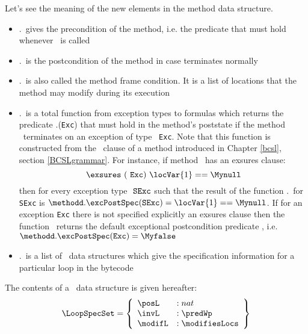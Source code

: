Let's see the meaning of the new elements in the method data structure.
\begin{itemize}
     \item \methodd.\pre \ gives the precondition of the method, i.e. the predicate that must hold
           whenever \methodd \  is called
     \item \methodd.\normalPost \ is the postcondition of the method in case \methodd{} terminates normally  
     
     \item \methodd.\modif \ is also called the method frame condition. It is a list of locations that the method
            may modify during its execution    
     
     \item \methodd.\excPostSpec \ is a total function from exception types to formulas which returns the predicate
           \methodd.\excPostSpec(\texttt{Exc})  that must hold in the method's poststate 
	   if the method \methodd \ terminates on an exception of type \mbox{ \rm \texttt{Exc}}. 
	   Note that this function is constructed from the \exsures \ clause of a method introduced in  Chapter \ref{bcsl},
	   section \ref{BCSLgrammar}. For instance, if method \methodd \ has an exsures clause:
	   $$ \exsures \  ( \mbox{ \rm \texttt{Exc}}) \ \locVar{1} == \Mynull $$
	   then for every exception type $\mbox{ \rm \texttt{SExc}} $ such that 
	    the result of the function \methodd.\excPostSpec \  for  \texttt{SExc} 
           is $\methodd.\excPostSpec(\texttt{SExc} ) = \locVar{1} == \Mynull$. If for an exception \texttt{Exc} there is not specified
	   explicitly an exsures clause then the function \excPostSpec \ returns the default exceptional postcondition predicate \Myfalse, i.e.
	   $\methodd.\excPostSpec(\texttt{Exc} ) = \Myfalse$
     \item \methodd.\loopSpecTable \ is a list of \LoopSpecSet \ data structures which give the specification information 
           for a particular loop in the bytecode         
\end{itemize}

 
The contents of a \LoopSpecSet \ data structure is given hereafter:
$$ \begin{array}{l}
      \LoopSpecSet = \left\{\begin{array}{ll}  
                                       \posL   & : nat \\
                                       \invL   & : \predWp \\                 
	                               \modifL   & :   \modifiesLocs
                            \end{array}  \right\} 
     \end{array} $$ 


